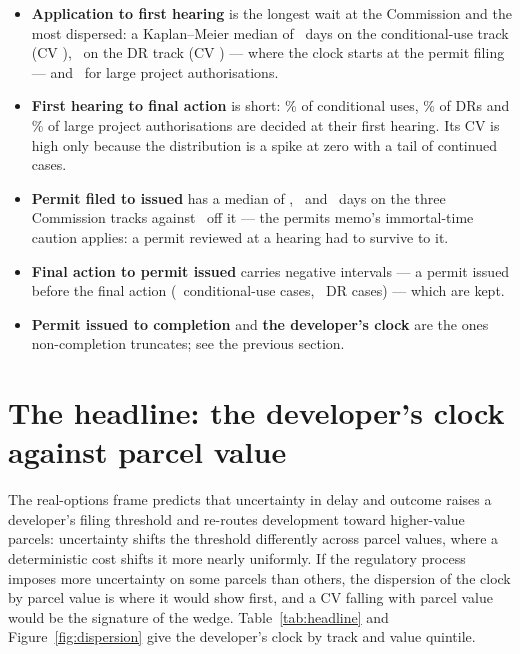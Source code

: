 \documentclass[11pt]{article}
\begin{document}
\begin{itemize}
\item \textbf{Application to first hearing} is the longest wait at the Commission and the most
dispersed: a Kaplan--Meier median of \ckAppHearingMedCu\ days on the conditional-use track (CV
\ckAppHearingCvCu), \ckAppHearingMedDr\ on the DR track (CV \ckAppHearingCvDr) --- where the
clock starts at the permit filing --- and \ckAppHearingMedLpa\ for large project authorisations.
\item \textbf{First hearing to final action} is short: \ckFirstFinalPctCu\% of conditional uses,
\ckFirstFinalPctDr\% of DRs and \ckFirstFinalPctLpa\% of large project authorisations are decided
at their first hearing. Its CV is high only because the distribution is a spike at zero with a
tail of continued cases.
\item \textbf{Permit filed to issued} has a median of \ckFiledIssuedMedCu, \ckFiledIssuedMedDr\
and \ckFiledIssuedMedLpa\ days on the three Commission tracks against \ckFiledIssuedMedMin\ off
it --- the permits memo's immortal-time caution applies: a permit reviewed at a hearing had to
survive to it.
\item \textbf{Final action to permit issued} carries negative intervals --- a permit issued
before the final action (\ckFinalIssuedNegCu\ conditional-use cases, \ckFinalIssuedNegDr\ DR
cases) --- which are kept.
\item \textbf{Permit issued to completion} and \textbf{the developer's clock} are the ones
non-completion truncates; see the previous section.
\end{itemize}



\section{The headline: the developer's clock against parcel value}

The real-options frame predicts that uncertainty in delay and outcome raises a developer's
filing threshold and re-routes development toward higher-value parcels: uncertainty shifts the
threshold differently across parcel values, where a deterministic cost shifts it more nearly
uniformly. If the regulatory
process imposes more uncertainty on some parcels than others, the dispersion of the clock by
parcel value is where it would show first, and a CV falling with parcel value would be the
signature of the wedge. Table~\ref{tab:headline} and Figure~\ref{fig:dispersion} give the
developer's clock by track and value quintile.
\end{document}
